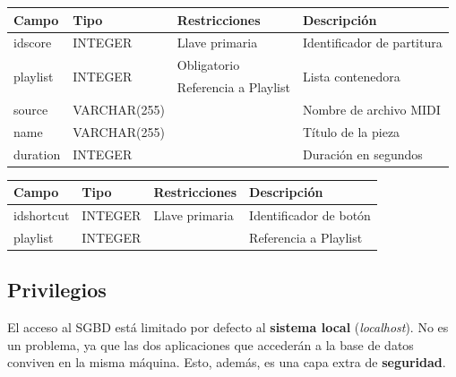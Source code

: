 \smallskip

\smallskip

\begin{center}
	\begin{tabular}{|l|l|l|l|}
		\hline \textbf{Campo} & \textbf{Tipo} & \textbf{Restricciones} & \textbf{Descripción} \\ 
		\hline idscore & INTEGER & Llave primaria & Identificador de partitura \\ 
		\hline \multirow{2}{*}{playlist} & \multirow{2}{*}{INTEGER} & Obligatorio & \multirow{2}{*}{Lista contenedora} \\
		\cline{3-3} & & Referencia a Playlist & \\
		\hline source & VARCHAR(255) & & Nombre de archivo MIDI \\
		\hline name & VARCHAR(255) & & Título de la pieza \\
		\hline duration & INTEGER & & Duración en segundos \\
		\hline 
	\end{tabular}
	\smallskip
\end{center}

\smallskip

\smallskip

\begin{center}
	\begin{tabular}{|l|l|l|l|}
		\hline \textbf{Campo} & \textbf{Tipo} & \textbf{Restricciones} & \textbf{Descripción} \\ 
		\hline idshortcut & INTEGER & Llave primaria & Identificador de botón \\ 
		\hline playlist & INTEGER & & Referencia a Playlist \\ 
		\hline 
	\end{tabular}
	\smallskip
\end{center}

\smallskip

\subsection{Privilegios}

El acceso al \acrshort{SGBD} está limitado por defecto al \textbf{sistema local} (\textit{localhost}). No es un problema, ya que las dos aplicaciones que accederán a la base de datos conviven en la misma máquina. Esto, además, es una capa extra de \textbf{seguridad}.

